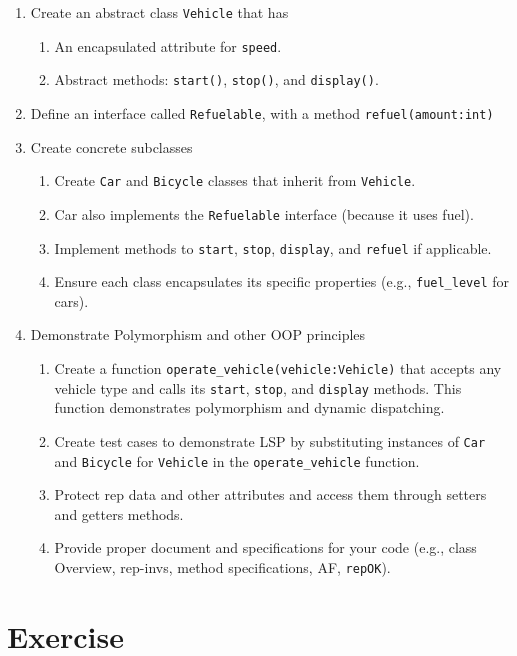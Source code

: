 \documentclass[oneside,11pt,dvipsnames]{book}
\newcommand{\code}[1]{\texttt{#1}}
\begin{document}
\begin{enumerate}
    \item Create an abstract class \code{Vehicle} that has
    \begin{enumerate}
        \item An encapsulated attribute for \code{speed}.
        \item Abstract methods: \code{start()}, \code{stop()}, and \code{display()}.
    \end{enumerate}
    \item Define an interface called \code{Refuelable}, with a method \code{refuel(amount:int)}
    \item Create concrete subclasses
    \begin{enumerate}
	    \item Create \code{Car} and \code{Bicycle} classes that inherit from \code{Vehicle}.
	    \item Car also implements the \code{Refuelable} interface (because it uses fuel).
	    \item Implement methods to \code{start}, \code{stop}, \code{display}, and \code{refuel} if applicable.
	    \item Ensure each class encapsulates its specific properties (e.g., \code{fuel\_level} for cars).
    \end{enumerate}
    \item Demonstrate Polymorphism and other OOP principles
    \begin{enumerate}
        \item Create a function \code{operate\_vehicle(vehicle:Vehicle)} that accepts any vehicle type and calls its \code{start}, \code{stop}, and \code{display} methods. This function demonstrates polymorphism and dynamic dispatching.
        \item Create test cases to demonstrate LSP by substituting instances of \code{Car} and \code{Bicycle} for \code{Vehicle} in the \code{operate\_vehicle} function. 
        \item Protect rep data and other attributes and access them through setters and getters methods.
    \item Provide proper document and specifications for your code (e.g., class Overview, rep-invs, method specifications, AF, \code{repOK}).
    \end{enumerate}

\end{enumerate}

\section{Exercise}
\end{document}
